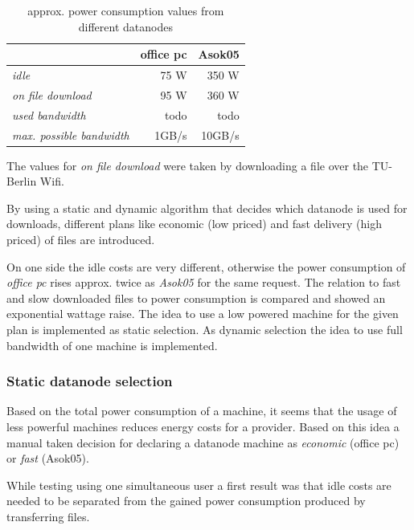 \begin{table}
	\centering
	\caption{approx. power consumption values from different datanodes}	
	\begin{tabular}{|l|r|r|}
		\hline \rule[-2ex]{0pt}{5.5ex}  & \textbf{office pc} & \textbf{Asok05} \\ 
		\hline \rule[-2ex]{0pt}{5.5ex} \textit{idle} &   75 W &   350 W \\ 
		\hline \rule[-2ex]{0pt}{5.5ex} \textit{on file download} &   95 W &   360 W \\ 
		\hline \rule[-2ex]{0pt}{5.5ex} \textit{used bandwidth} & todo & todo \\
		\hline \rule[-2ex]{0pt}{5.5ex} \textit{max. possible bandwidth} & 1GB/s & 10GB/s \\
		\hline
	\end{tabular} 
	\label{tab:powerconsumptionvalues}
\end{table}

The values for \textit{on file download} were taken by downloading a file over the TU-Berlin Wifi.

By using a static and dynamic algorithm that decides which datanode is used for downloads, different plans like economic (low priced) and fast delivery (high priced) of files are introduced.

On one side the idle costs are very different, otherwise the power consumption of \textit{office pc} rises approx. twice as \textit{Asok05} for the same request. The relation to fast and slow downloaded files to power consumption is compared and showed an exponential wattage raise. The idea to use a low powered machine for the given plan is implemented as static selection. As dynamic selection the idea to use full bandwidth of one machine is implemented.

\subsubsection{Static datanode selection}

Based on the total power consumption of a machine, it seems that the usage of less powerful machines reduces energy costs for a provider. Based on this idea a manual taken decision for declaring a datanode machine as \textit{economic} (office pc) or \textit{fast} (Asok05). 

While testing using one simultaneous user a first result was that idle costs are needed to be separated from the gained power consumption produced by transferring files. 

